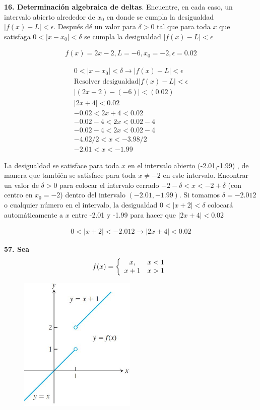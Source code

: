 \documentclass[12pt, letterpaper]{article}
\begin{document}
\textbf{16. Determinación algebraica de deltas}. Encuentre, en cada caso, un intervalo abierto alrededor de $x_0$ en donde se cumpla la desigualdad  $|f(x) - L| < \epsilon$. Después dé un valor para $\delta > 0$ tal que para toda $x$ que satisfaga $0 < |x - x_0| < \delta$ se cumpla la desigualdad $|f(x) - L| < \epsilon $

\begin{align*}
	f(x) = 2x - 2, L = -6, x_0 = -2, \epsilon = 0.02
\end{align*}

\begin{align*}
	0 < | x - x_0| < \delta \rightarrow | f(x)-L |<\epsilon\\
	\text{Resolver desigualdad}| f(x)-L |<\epsilon\\
	| (2x - 2) - (-6) |< (0.02)\\
	| 2x + 4 |< 0.02\\
	-0.02 < 2x + 4 < 0.02\\
	-0.02 - 4 < 2x < 0.02 - 4\\
	-0.02 - 4 < 2x < 0.02 - 4\\
	-4.02/ 2 < x < -3.98/ 2\\
	- 2.01 < x < - 1.99
\end{align*}

La desigualdad se satisface para toda $x$ en el intervalo abierto (-2.01,-1.99) , de manera que también se satisface para toda $x \neq -2$ en este intervalo.
Encontrar un valor de $\delta > 0 $ para colocar el intervalo cerrado $-2 - \delta < x < -2 + \delta$ (con centro en $x_0 = -2$) dentro del intervalo $(-2.01,-1.99)$. Si tomamos $\delta = -2.012$ o cualquier número en el intervalo,  la desigualdad $0 < | x + 2| < \delta$ colocará automáticamente a $x$ entre -2.01 y -1.99 para hacer que  $| 2x + 4 |< 0.02$ 

\begin{align*}
	0 < | x + 2| < - 2.012 \rightarrow | 2x + 4 |< 0.02
\end{align*}

\textbf{57. Sea}
$$f(x) = \left\{
\begin{array}{c l}
 x,  & x < 1\\
 x+1  & x >1
\end{array}
\right.
$$

\begin{figure}[tbh]
\centering
\includegraphics[width=15em]{t10tres}
\end{figure}
\end{document}

